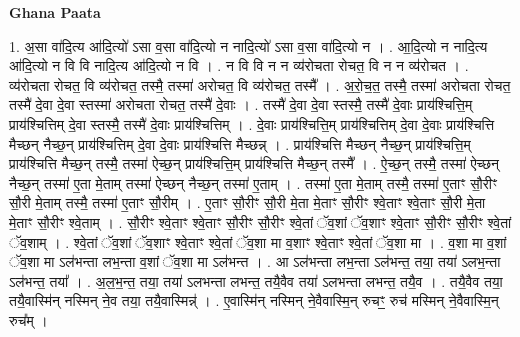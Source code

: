 \documentclass[17pt]{extarticle}
\begin{document}
\textbf{Ghana Paata } \newline

1. अ॒सा वा॑दि॒त्य आ॑दि॒त्यो॑ ऽसा व॒सा वा॑दि॒त्यो न नादि॒त्यो॑ ऽसा व॒सा वा॑दि॒त्यो न । . आ॒दि॒त्यो न नादि॒त्य आ॑दि॒त्यो न वि वि नादि॒त्य आ॑दि॒त्यो न वि । . न वि वि न न व्य॑रोचता रोचत॒ वि न न व्य॑रोचत । . व्य॑रोचता रोचत॒ वि व्य॑रोचत॒ तस्मै॒ तस्मा॑ अरोचत॒ वि व्य॑रोचत॒ तस्मै᳚ । . अ॒रो॒च॒त॒ तस्मै॒ तस्मा॑ अरोचता रोचत॒ तस्मै॑ दे॒वा दे॒वा स्तस्मा॑ अरोचता रोचत॒ तस्मै॑ दे॒वाः । . तस्मै॑ दे॒वा दे॒वा स्तस्मै॒ तस्मै॑ दे॒वाः प्राय॑श्चित्ति॒म् प्राय॑श्चित्तिम् दे॒वा स्तस्मै॒ तस्मै॑ दे॒वाः प्राय॑श्चित्तिम् । . दे॒वाः प्राय॑श्चित्ति॒म् प्राय॑श्चित्तिम् दे॒वा दे॒वाः प्राय॑श्चित्ति मैच्छन् नैच्छ॒न् प्राय॑श्चित्तिम् दे॒वा दे॒वाः प्राय॑श्चित्ति मैच्छन्न् । . प्राय॑श्चित्ति मैच्छन् नैच्छ॒न् प्राय॑श्चित्ति॒म् प्राय॑श्चित्ति मैच्छ॒न् तस्मै॒ तस्मा॑ ऐच्छ॒न् प्राय॑श्चित्ति॒म् प्राय॑श्चित्ति मैच्छ॒न् तस्मै᳚ । . ऐ॒च्छ॒न् तस्मै॒ तस्मा॑ ऐच्छन् नैच्छ॒न् तस्मा॑ ए॒ता मे॒ताम् तस्मा॑ ऐच्छन् नैच्छ॒न् तस्मा॑ ए॒ताम् । . तस्मा॑ ए॒ता मे॒ताम् तस्मै॒ तस्मा॑ ए॒ताꣳ सौ॒रीꣳ सौ॒री मे॒ताम् तस्मै॒ तस्मा॑ ए॒ताꣳ सौ॒रीम् । . ए॒ताꣳ सौ॒रीꣳ सौ॒री मे॒ता मे॒ताꣳ सौ॒रीꣳ श्वे॒ताꣳ श्वे॒ताꣳ सौ॒री मे॒ता मे॒ताꣳ सौ॒रीꣳ श्वे॒ताम् । . सौ॒रीꣳ श्वे॒ताꣳ श्वे॒ताꣳ सौ॒रीꣳ सौ॒रीꣳ श्वे॒तां ॅव॒शां ॅव॒शाꣳ श्वे॒ताꣳ सौ॒रीꣳ सौ॒रीꣳ श्वे॒तां ॅव॒शाम् । . श्वे॒तां ॅव॒शां ॅव॒शाꣳ श्वे॒ताꣳ श्वे॒तां ॅव॒शा मा व॒शाꣳ श्वे॒ताꣳ श्वे॒तां ॅव॒शा मा । . व॒शा मा व॒शां ॅव॒शा मा ऽल॑भन्ता लभ॒न्ता व॒शां ॅव॒शा मा ऽल॑भन्त । . आ ऽल॑भन्ता लभ॒न्ता ऽल॑भन्त॒ तया॒ तया॑ ऽलभ॒न्ता ऽल॑भन्त॒ तया᳚ । . अ॒ल॒भ॒न्त॒ तया॒ तया॑ ऽलभन्ता लभन्त॒ तयै॒वैव तया॑ ऽलभन्ता लभन्त॒ तयै॒व । . तयै॒वैव तया॒ तयै॒वास्मि॑न् नस्मिन् ने॒व तया॒ तयै॒वास्मिन्न्॑ । . ए॒वास्मि॑न् नस्मिन् ने॒वैवास्मि॒न् रुचꣳ॒॒ रुच॑ मस्मिन् ने॒वैवास्मि॒न् रुच᳚म् । \newline
\end{document}

